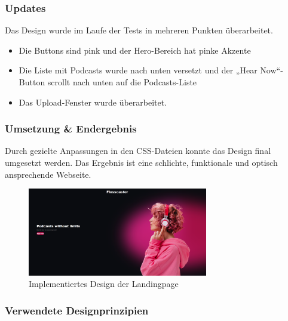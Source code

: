 \documentclass{article}
\begin{document}
\subsubsection{Updates}
Das Design wurde im Laufe der Tests in mehreren Punkten überarbeitet.

\begin{itemize}
  \item Die Buttons sind pink und der Hero-Bereich hat pinke Akzente
  \item Die Liste mit Podcasts wurde nach unten versetzt und der „Hear Now“-Button scrollt nach unten auf die Podcasts-Liste
  \item Das Upload-Fenster wurde überarbeitet.
\end{itemize}

\subsubsection{Umsetzung \& Endergebnis}
Durch gezielte Anpassungen in den CSS-Dateien konnte das Design final umgesetzt werden. Das Ergebnis ist eine schlichte, funktionale und optisch ansprechende Webseite.

\begin{figure}[h]
  \caption{Implementiertes Design der Landingpage}
  \centering
  \includegraphics[width=0.7\textwidth]{flosscaster3.png}
\end{figure}

\subsubsection{Verwendete Designprinzipien}
\end{document}

